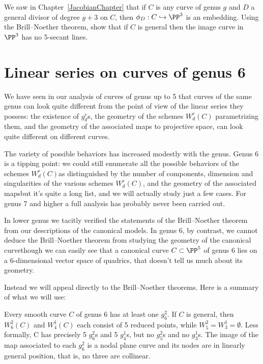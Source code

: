\begin{exercise}
We saw in Chapter~\ref{JacobianChapter} that if $C$ is any curve of genus
$g$ and $D$ a general divisor of degree $g+3$ on $C$, then $\phi_D :
C \hookrightarrow \PP^3$ is an embedding. Using the Brill--Noether
theorem, show that if $C$ is general then the image curve in $\PP^3$
has no 5-secant lines.
\end{exercise}

\section{Linear series on curves of genus 6}
\label{genus 6 section}\label{general genus 6}

We have seen in our analysis of curves of genus up to 5 that curves of the
same genus can look quite different from the point of view of the linear
series they possess: the existence of $g^r_d$s,  the geometry of the
schemes $W^r_d(C)$ parametrizing them, and the geometry of the associated
maps to projective space, can look quite different on different curves.

The variety of possible behaviors has increased modestly with the
genus. Genus 6 is a tipping point: we could still enumerate all the
possible behaviors of the schemes $W^r_d(C)$\emdash as distinguished
by the number of components, dimension and singularities of the various
schemes $W^r_d(C)$, and the geometry of the associated maps\emdash but
it's quite a long list, and we will actually study just a few cases. For
genus 7 and higher a full analysis has probably never been carried out.

In lower genus we tacitly verified the statements of the Brill--Noether
theorem from our descriptions of the canonical models. In genus 6, by
contrast, we cannot  deduce the Brill--Noether theorem from studying
the geometry of the canonical curve\emdash though we can easily see that
a canonical curve $C \subset \PP^5$ of genus 6 lies on a 6-dimensional
vector space of quadrics, that doesn't tell us much about its geometry.

Instead we will appeal directly to the Brill--Noether theorems. Here is
a summary of what we will use:

\begin{theorem}\label{BN consequences}
Every smooth curve $C$ of genus 6 has at least one $g^{2}_{6}$. If $C$
is general, then
$W^{2}_{6}(C)$ and $W^{1}_{4}(C)$ each consist of 5 reduced points,
while $W^{2}_{5} = W^{1}_{3} = \emptyset$.  Less formally, C has
precisely 5 $g^{2}_{6}$s and 5 $g^{1}_{4}$s, but no $g^{2}_{5}$s and
no $g^{1}_{3}$s. The image of the map associated to each $g^{2}_{6}$
is a nodal plane curve and its nodes are in linearly general position,
that is, no three are collinear.
\end{theorem}

